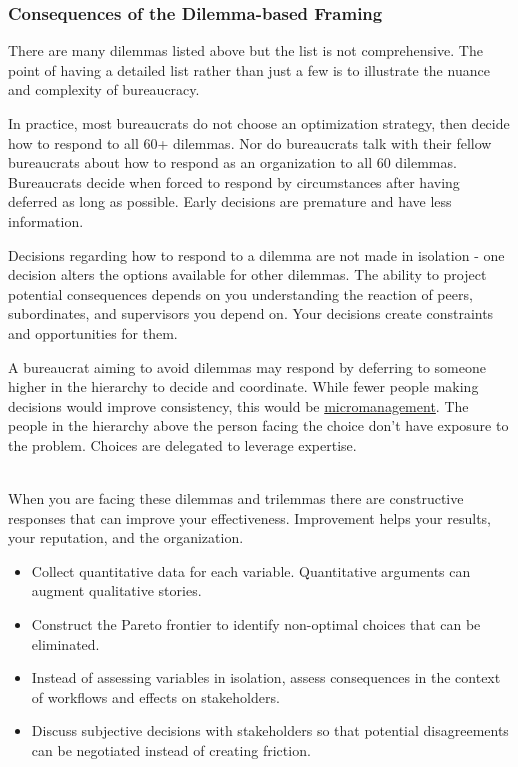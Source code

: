 \subsubsection*{Consequences of the Dilemma-based Framing}

There are many dilemmas listed above but the list is not comprehensive. The point of having a detailed list rather than just a few is to illustrate the nuance and complexity of bureaucracy. 


In practice, most bureaucrats do not choose an optimization strategy, then decide how to respond to all 60+ dilemmas.
Nor do bureaucrats talk with their fellow bureaucrats about how to respond as an organization to all 60 dilemmas.
Bureaucrats decide when forced to respond by circumstances after having deferred as long as possible. Early decisions are premature and have less information.

Decisions regarding how to respond to a dilemma are not made in isolation - one decision alters the options available for other dilemmas. The ability to project potential consequences depends on you understanding the reaction of peers, subordinates, and supervisors you depend on. Your decisions create constraints and opportunities for them.



A bureaucrat aiming to avoid dilemmas may respond by deferring to someone higher in the hierarchy to decide and coordinate. While fewer people making decisions would improve consistency, this would be \href{https://en.wikipedia.org/wiki/Micromanagement}{micromanagement}. 
The people in the hierarchy above the person facing the choice don't have exposure to the problem. Choices are delegated to leverage expertise. 

\ \\

When you are facing these dilemmas and trilemmas
there are constructive responses that can improve your effectiveness. Improvement helps your results, your reputation, and the organization. 
\begin{itemize}
    \item Collect quantitative data for each variable. Quantitative arguments can augment qualitative stories. 
    \item Construct the Pareto frontier to identify non-optimal choices that can be eliminated.
    \item Instead of assessing variables in isolation, assess consequences in the context of workflows and effects on stakeholders.
    \item Discuss subjective decisions with stakeholders so that potential disagreements can be negotiated instead of creating friction.
\end{itemize}
 



